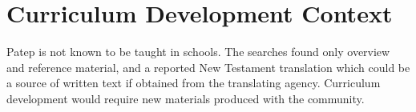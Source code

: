 \documentclass[12pt]{article}
\begin{document}
\section{Curriculum Development Context}
Patep is not known to be taught in schools. The searches found only overview and reference material, and a reported New Testament translation which could be a source of written text if obtained from the translating agency. Curriculum development would require new materials produced with the community.
\end{document}
